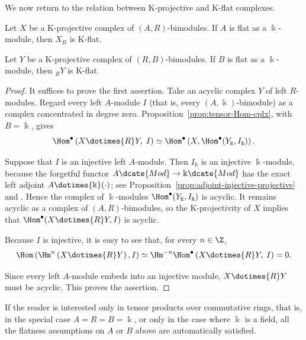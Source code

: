 We now return to the relation between K-projective and K-flat complexes.

\begin{lemma}\label{prop:K-projective-flat}
	Let $X$ be a K-projective complex of $(A,R)$-bimodules. If $A$ is flat as
	a $\Bbbk$-module, then $X_R$ is K-flat.

	Let $Y$ be a K-projective complex of $(R,B)$-bimodules. If $B$ is flat as
	a $\Bbbk$-module, then ${}_RY$ is K-flat.
\end{lemma}

\begin{proof}
	It suffices to prove the first assertion. Take an acyclic complex $Y$ of
	left $R$-modules. Regard every left $A$-module $I$ (that is, every
	$(A,\Bbbk)$-bimodule) as a complex concentrated in degree zero.
	Proposition~\ref{prop:tensor-Hom-cplx}, with $B=\Bbbk$, gives
	\[ \Hom^\bullet\left(X \dotimes{R} Y, \; I\right) \simeq \Hom^\bullet\left(X, \Hom^\bullet(Y_{\Bbbk}, I_{\Bbbk}) \right). \]

	Suppose that $I$ is an injective left $A$-module. Then $I_{\Bbbk}$ is an
	injective $\Bbbk$-module, because the forgetful functor
	$A\dcate{Mod}\to\Bbbk\dcate{Mod}$ has the exact left adjoint
	$A\dotimes{\Bbbk}(\cdot)$; see
	Proposition~\ref{prop:adjoint-injective-projective} and
	\cite[Corollary 6.6.8]{Li1}. Hence the complex of $\Bbbk$-modules
	$\Hom^\bullet(Y_{\Bbbk},I_{\Bbbk})$ is acyclic. It remains acyclic as a
	complex of $(A,R)$-bimodules, so the K-projectivity of $X$ implies that
	$\Hom^\bullet(X\dotimes{R}Y,I)$ is acyclic.

	Because $I$ is injective, it is easy to see that, for every $n\in\Z$,
	\[ \Hom\left( \Hm^n\left( X \dotimes{R} Y \right), I\right) \simeq \Hm^{-n} \Hom^\bullet\left( X \dotimes{R} Y, \; I \right) = 0. \]

	Since every left $A$-module embeds into an injective module,
	$X\dotimes{R}Y$ must be acyclic. This proves the assertion.
\end{proof}

If the reader is interested only in tensor products over commutative rings,
that is, in the special case $A=R=B=\Bbbk$, or only in the case where
$\Bbbk$ is a field, all the flatness assumptions on $A$ or $B$ above are
automatically satisfied.

